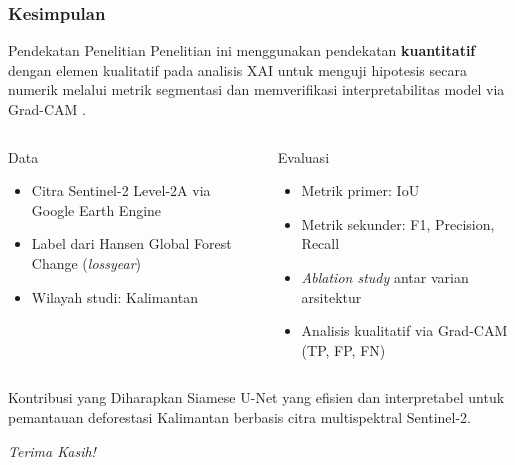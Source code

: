 \documentclass{beamer}
\begin{document}
	\begin{frame}[allowframebreaks]
		\frametitle{Kesimpulan}
		
		\begin{block}{Pendekatan Penelitian}
			\small
			Penelitian ini menggunakan pendekatan 
			\textbf{kuantitatif} dengan elemen 
			kualitatif pada analisis XAI untuk menguji hipotesis 
			secara numerik melalui metrik segmentasi dan 
			memverifikasi interpretabilitas model via Grad-CAM
			.
		\end{block}
		
		
		\begin{columns}[T]
			
			\begin{block}{Data}
				\small
				\begin{itemize}
					\item Citra Sentinel-2 Level-2A 
					via Google Earth Engine
					\item Label dari Hansen Global 
					Forest Change (\textit{lossyear})
					\item Wilayah studi: Kalimantan
				\end{itemize}
			\end{block}
			
			\column{0.48\textwidth}
			\begin{block}{Evaluasi}
				\small
				\begin{itemize}
					\item Metrik primer: IoU
					\item Metrik sekunder: F1, 
					Precision, Recall
					\item \textit{Ablation study} 
					antar varian arsitektur
					\item Analisis kualitatif 
					via Grad-CAM (TP, FP, FN)
				\end{itemize}
			\end{block}
			
		\end{columns}
		
		\begin{alertblock}{Kontribusi yang Diharapkan}
			\small
			Siamese U-Net yang efisien dan interpretabel 
			untuk pemantauan deforestasi Kalimantan 
			berbasis citra multispektral Sentinel-2.
		\end{alertblock}
		
	\end{frame}

	\begin{frame}
		\begin{center}
				\vspace{0.15cm}
				\Huge\textit{Terima Kasih!}
		\end{center}
	\end{frame}
\end{document}
